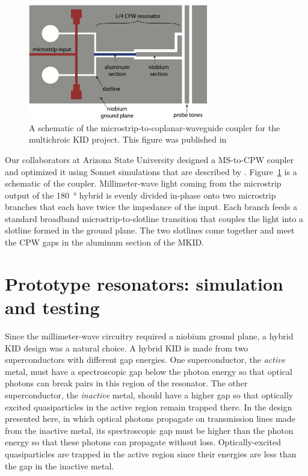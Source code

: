 \begin{figure}[htb]
\centering
\includegraphics[width=0.7\textwidth]{multichroic/multichroic_ms-to-cpw_coupler_schematic.png}
\caption[A schematic of the microstrip-to-coplanar-waveguide coupler for the multichroic KID project.]
{
A schematic of the microstrip-to-coplanar-waveguide coupler for the multichroic KID project.
This figure was published in \textcite{Johnson2016SPIE}
}
\label{fig:multichroic_ms-to-cpw_coupler_schematic}
\end{figure}

Our collaborators at Arizona State University designed a MS-to-CPW coupler and optimized it using Sonnet simulations that are described by \textcite{Surdi2016}.  %
Figure~\ref{fig:multichroic_ms-to-cpw_coupler_schematic} is a schematic of the coupler.
Millimeter-wave light coming from the microstrip output of the \SI{180}{\degree} hybrid is evenly divided in-phase onto two microstrip branches that each have twice the impedance of the input.
Each branch feeds a standard broadband microstrip-to-slotline transition that couples the light into a slotline formed in the ground plane.
The two slotlines come together and meet the CPW gaps in the aluminum section of the MKID.


\section{Prototype resonators: simulation and testing}
\label{sec:multichroic.prototype}

Since the millimeter-wave circuitry required a niobium ground plane, a hybrid KID design was a natural choice.
A hybrid KID is made from two superconductors with different gap energies.
One superconductor, the \textit{active} metal, must have a spectroscopic gap below the photon energy so that optical photons can break pairs in this region of the resonator.
The other superconductor, the \textit{inactive} metal, should have a higher gap so that optically excited quasiparticles in the active region remain trapped there.
In the design presented here, in which optical photons propagate on transmission lines made from the inactive metal, its spectroscopic gap must be higher than the photon energy so that these photons can propagate without loss.
Optically-excited quasiparticles are trapped in the active region since their energies are less than the gap in the inactive metal.


